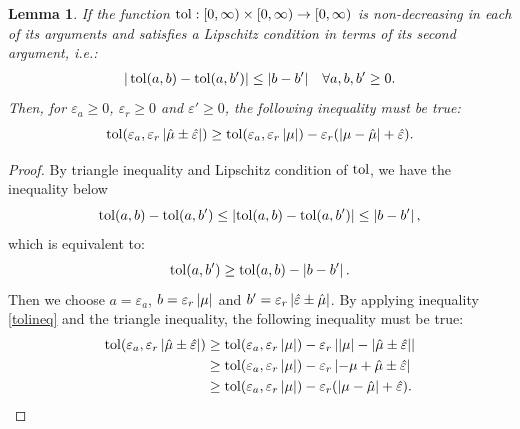 \documentclass{iitthesis}
\newtheorem{lemma}[theorem]{Lemma}
\theoremstyle{definition}
\begin{document}
\begin{lemma}\label{cost1}
If the function $\operatorname{tol}: [0, \infty) \times [0, \infty) \to [0,\infty)$ is non-decreasing in each of its arguments and satisfies a Lipschitz condition in terms of its second argument, i.e.:
\begin{align}
|\operatorname{tol} (a,b)-\operatorname{tol} (a,b')| \leq |b-b'| \quad \forall a,b,b' \geq 0.
\end{align}
Then, for $\varepsilon_a \geq 0$, $\varepsilon_r\geq 0$ and $\varepsilon' \geq 0$, the following inequality must be true:
\begin{equation}\label{lipstol}
\operatorname{tol} (\varepsilon_a, \varepsilon_r \left \lvert \hat{\mu} \pm\hat{\varepsilon}  \right \rvert) \geq \operatorname{tol}(\varepsilon_a,\varepsilon_r \left \lvert \mu \right \rvert)-\varepsilon_r (\left \lvert \mu-\hat{\mu} \right \rvert + \hat{\varepsilon}).
\end{equation}
\end{lemma}
\begin{proof}
By triangle inequality and Lipschitz condition of $\operatorname{tol}$, we have the inequality below
 $$\operatorname{tol}(a,b) -\operatorname{tol}(a,b') \leq \left \lvert \operatorname{tol}(a,b) -\operatorname{tol}(a,b') \right \rvert \leq \left \lvert b-b' \right \rvert,$$
which is equivalent to:
\begin{align}\label{tolineq}
\operatorname{tol}(a,b') \geq \operatorname{tol}(a,b)-\left \lvert b-b' \right \rvert.
\end{align}
Then we choose $a = \varepsilon_a$, $b =\varepsilon_r\left \lvert \mu \right \rvert$ and $b'=\varepsilon_r\left \lvert \hat{\varepsilon} \pm \hat{\mu} \right \rvert$. By applying inequality \eqref{tolineq} and the triangle inequality, the following inequality must be true:
\begin{align*}
\operatorname{tol} (\varepsilon_a, \varepsilon_r \left \lvert \hat{\mu} \pm\hat{\varepsilon} \right \rvert) &
 \geq \operatorname{tol}(\varepsilon_a,\varepsilon_r \left \lvert \mu \right \rvert)-\varepsilon_r \left \lvert \left \lvert \mu \right \rvert-\left \lvert \hat{\mu}  \pm \hat{\varepsilon} \right \rvert \right \rvert \\&\geq \operatorname{tol}(\varepsilon_a,\varepsilon_r \left \lvert \mu \right \rvert)-\varepsilon_r \left \lvert -\mu+\hat{\mu} \pm \hat{\varepsilon} \right \rvert \\&
 \geq \operatorname{tol}(\varepsilon_a,\varepsilon_r \left \lvert \mu \right \rvert)-\varepsilon_r (\left \lvert \mu-\hat{\mu} \right \rvert + \hat{\varepsilon}).
\end{align*}
\end{proof}
\end{document}
